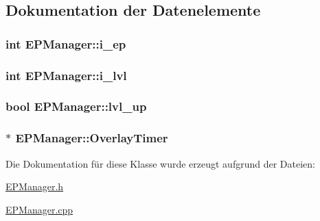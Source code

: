 \subsection{Dokumentation der Datenelemente}
\hypertarget{class_e_p_manager_a882d4694fe62f9cdb3e733f834cd0219}{
\subsubsection[{i\-\_\-ep}]{\setlength{\rightskip}{0pt plus 5cm}int E\-P\-Manager\-::i\-\_\-ep\hspace{0.3cm}{\ttfamily [private]}}}\label{class_e_p_manager_a882d4694fe62f9cdb3e733f834cd0219}
\hypertarget{class_e_p_manager_aac2f80caa45bf38ae7af14f341f4dfd5}{
\subsubsection[{i\-\_\-lvl}]{\setlength{\rightskip}{0pt plus 5cm}int E\-P\-Manager\-::i\-\_\-lvl\hspace{0.3cm}{\ttfamily [private]}}}\label{class_e_p_manager_aac2f80caa45bf38ae7af14f341f4dfd5}
\hypertarget{class_e_p_manager_abe039770fe63d4e4e685ed5abf738fa6}{
\subsubsection[{lvl\-\_\-up}]{\setlength{\rightskip}{0pt plus 5cm}bool E\-P\-Manager\-::lvl\-\_\-up\hspace{0.3cm}{\ttfamily [private]}}}\label{class_e_p_manager_abe039770fe63d4e4e685ed5abf738fa6}
\hypertarget{class_e_p_manager_a93cd7523f6b1fd86a8dc62976bcd2c88}{
\subsubsection[{Overlay\-Timer}]{$\ast$ E\-P\-Manager\-::\-Overlay\-Timer\hspace{0.3cm}{\ttfamily [private]}}}\label{class_e_p_manager_a93cd7523f6b1fd86a8dc62976bcd2c88}


Die Dokumentation für diese Klasse wurde erzeugt aufgrund der Dateien\-:\begin{DoxyCompactItemize}
\item 
\hyperlink{_e_p_manager_8h}{E\-P\-Manager.\-h}\item 
\hyperlink{_e_p_manager_8cpp}{E\-P\-Manager.\-cpp}\end{DoxyCompactItemize}
